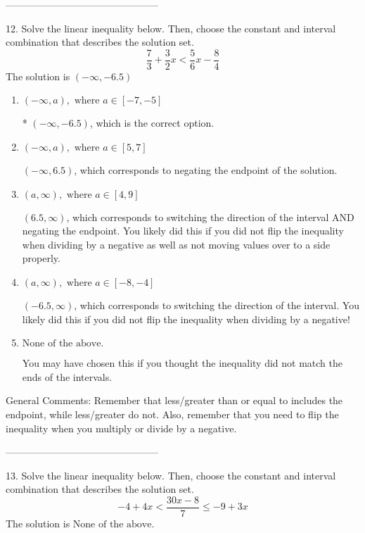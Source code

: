 \documentclass{extbook}[14pt]
\begin{document}
-----------------------------------------------

12. Solve the linear inequality below. Then, choose the constant and interval combination that describes the solution set.
\[ \frac{7}{3} + \frac{3}{2} x < \frac{5}{6} x - \frac{8}{4} \] 
The solution is $ (-\infty, -6.5) $ 

\begin{enumerate}[label=\Alph*.] 
\item $ (-\infty, a), \text{ where } a \in [-7, -5] $ 

 * $(-\infty, -6.5)$, which is the correct option. 
\item $ (-\infty, a), \text{ where } a \in [5, 7] $ 

  $(-\infty, 6.5)$, which corresponds to negating the endpoint of the solution. 
\item $ (a, \infty), \text{ where } a \in [4, 9] $ 

  $(6.5, \infty)$, which corresponds to switching the direction of the interval AND negating the endpoint. You likely did this if you did not flip the inequality when dividing by a negative as well as not moving values over to a side properly. 
\item $ (a, \infty), \text{ where } a \in [-8, -4] $ 

  $(-6.5, \infty)$, which corresponds to switching the direction of the interval. You likely did this if you did not flip the inequality when dividing by a negative! 
\item $ \text{None of the above}. $ 

 You may have chosen this if you thought the inequality did not match the ends of the intervals. 
\end{enumerate} 
 
General Comments: Remember that less/greater than or equal to includes the endpoint, while less/greater do not. Also, remember that you need to flip the inequality when you multiply or divide by a negative.

-----------------------------------------------

13. Solve the linear inequality below. Then, choose the constant and interval combination that describes the solution set.
\[ -4 + 4 x < \frac{30 x - 8}{7} \leq -9 + 3 x \] 
The solution is $ \text{None of the above.} $ 
\end{document}
